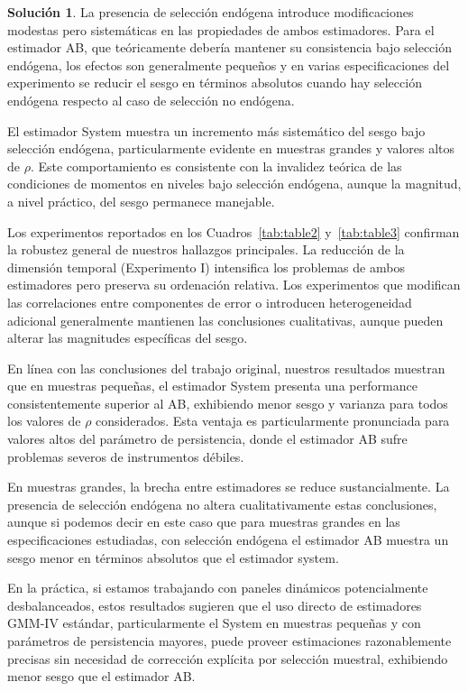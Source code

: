 \documentclass[12pt,letterpaper,reqno,oneside]{amsart}
\theoremstyle{problemstyle} %
\theoremstyle{definition} %
\newtheorem{solution}{Solución}[problem]
\begin{document}
\begin{solution}
  La presencia de selección endógena introduce modificaciones modestas pero sistemáticas en las propiedades de ambos estimadores.
  Para el estimador AB, que teóricamente debería mantener su consistencia bajo selección endógena, los efectos son generalmente pequeños y en varias especificaciones del experimento se reducir el sesgo en términos absolutos cuando hay selección endógena respecto al caso de selección no endógena.

  El estimador System muestra un incremento más sistemático del sesgo bajo selección endógena, particularmente evidente en muestras grandes y valores altos de $\rho$.
  Este comportamiento es consistente con la invalidez teórica de las condiciones de momentos en niveles bajo selección endógena, aunque la magnitud, a nivel práctico, del sesgo permanece manejable.

  Los experimentos reportados en los Cuadros~\ref{tab:table2} y~\ref{tab:table3} confirman la robustez general de nuestros hallazgos principales.
  La reducción de la dimensión temporal (Experimento I) intensifica los problemas de ambos estimadores pero preserva su ordenación relativa.
  Los experimentos que modifican las correlaciones entre componentes de error o introducen heterogeneidad adicional generalmente mantienen las conclusiones cualitativas, aunque pueden alterar las magnitudes específicas del sesgo.

  En línea con las conclusiones del trabajo original, nuestros resultados muestran que en muestras pequeñas, el estimador System presenta una performance consistentemente superior al AB, exhibiendo menor sesgo y varianza para todos los valores de $\rho$ considerados.
  Esta ventaja es particularmente pronunciada para valores altos del parámetro de persistencia, donde el estimador AB sufre problemas severos de instrumentos débiles.

  En muestras grandes, la brecha entre estimadores se reduce sustancialmente.
  La presencia de selección endógena no altera cualitativamente estas conclusiones, aunque si podemos decir en este caso que para muestras grandes en las especificaciones estudiadas, con selección endógena el estimador AB muestra un sesgo menor en términos absolutos que el estimador system.

  En la práctica, si estamos trabajando con paneles dinámicos potencialmente desbalanceados, estos resultados sugieren que el uso directo de estimadores GMM-IV estándar, particularmente el System en muestras pequeñas y con parámetros de persistencia mayores, puede proveer estimaciones razonablemente precisas sin necesidad de corrección explícita por selección muestral, exhibiendo menor sesgo que el estimador AB.

\end{solution}
\endgroup
\printbibliography
\end{document}
